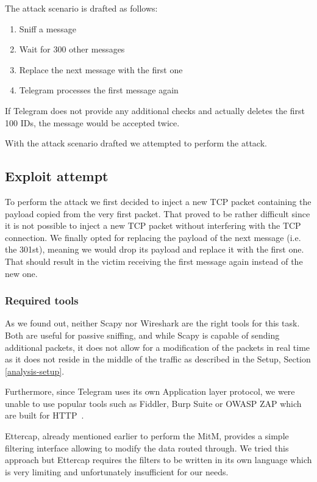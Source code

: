\documentclass[thesis=M,english]{FITthesis}[2012/10/20]
\begin{document}
The attack scenario is drafted as follows:

\begin{enumerate}
	\item Sniff a message
	\item Wait for 300 other messages
	\item Replace the next message with the first one
	\item Telegram processes the first message again
\end{enumerate}

If Telegram does not provide any additional checks and actually deletes the first 100 IDs, the message would be accepted twice.

With the attack scenario drafted we attempted to perform the attack.

\subsection{Exploit attempt}

To perform the attack we first decided to inject a new TCP packet containing the payload copied from the very first packet. That proved to be rather difficult since it is not possible to inject a new TCP packet without interfering with the TCP connection. We finally opted for replacing the payload of the next message (i.e. the 301st), meaning we would drop its payload and replace it with the first one. That should result in the victim receiving the first message again instead of the new one.

\subsubsection{Required tools}

As we found out, neither Scapy nor Wireshark are the right tools for this task. Both are useful for passive sniffing, and while Scapy is capable of sending additional packets, it does not allow for a modification of the packets in real time as it does not reside in the middle of the traffic as described in the Setup, Section \ref{analysis-setup}.

Furthermore, since Telegram uses its own Application layer protocol, we were unable to use popular tools such as Fiddler, Burp Suite or OWASP ZAP which are built for HTTP~\cite{fiddler-homepage, burp-homepage}.

Ettercap, already mentioned earlier to perform the MitM, provides a simple filtering interface allowing to modify the data routed through. We tried this approach but Ettercap requires the filters to be written in its own language which is very limiting and unfortunately insufficient for our needs.
\end{document}
